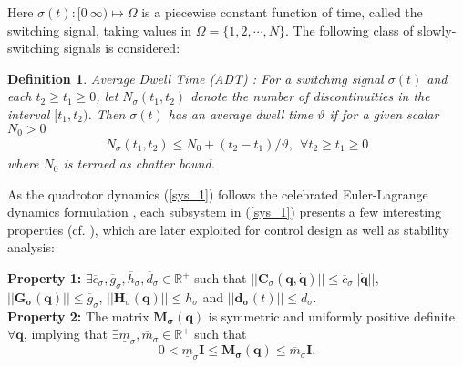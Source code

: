 \documentclass[AMA,STIX1COL,sort, compress]{WileyNJD-v2}
\newtheorem{mydef}{Definition}
\begin{document}

Here $\sigma(t) : [0~\infty) \mapsto \Omega$ is a piecewise constant function of time, called the switching signal, taking values in $\Omega=\lbrace 1,2, \cdots,N \rbrace $. The following class of slowly-switching signals is considered: %
\begin{mydef}
	Average Dwell Time (ADT) \cite{hespanha1999stability}: For a switching signal $\sigma(t)$ and each $t_2 \geq t_1 \geq 0$, let $N_{\sigma}(t_1,t_2)$ denote the number of discontinuities in the interval $[t_1,t_2)$. Then $\sigma(t)$ has an average dwell time $\vartheta$ if for a given scalar $N_0 >0$
	\begin{align*}
	N_{\sigma}(t_1,t_2) \leq N_0 + (t_2-t_1)/\vartheta,~~ \forall t_2 \geq t_1 \geq 0
	\end{align*}
	where $N_0$ is termed as chatter bound.
\end{mydef}

As the quadrotor dynamics (\ref{sys_1}) follows the celebrated Euler-Lagrange dynamics formulation \cite{tang2015mixed}, each subsystem in (\ref{sys_1}) presents a few interesting properties (cf. \cite{spong2008robot}), which are later exploited for control design as well as stability analysis:

\noindent \textbf{Property 1:} $\exists \overline c_{\sigma }, \overline g_{\sigma }, \overline h_{\sigma },\overline{d}_{\sigma} \in \mathbb{R}^{+}$ such that $||\mathbf C_{\sigma}(\mathbf q,\dot{\mathbf q})|| \leq \overline c_{\sigma } ||\dot{\mathbf q}||$, $||\mathbf{G_{\sigma}(q)}|| \leq \overline g_{\sigma }$, $||\mathbf{H}_\sigma( \mathbf q)|| \leq \overline h_{\sigma }$ and $||\mathbf{d_{\sigma}}(t)|| \leq \overline{d}_{\sigma}$.\\
\textbf{Property 2:} The matrix $\mathbf{M_{\sigma}(q)}$ is symmetric and uniformly positive definite $\forall \mathbf{q}$, implying that $\exists \underline m_{\sigma}, \overline m_{\sigma} \in \mathbb{R}^{+}$ such that
\begin{equation}\label{prop 3}
0 < \underline m_{ \sigma} \mathbf I \leq \mathbf{M_{\sigma}(q)} \leq \overline m_{ \sigma} \mathbf I .
\end{equation}
\end{document}
